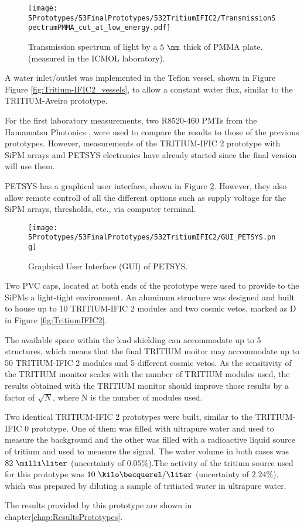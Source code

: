 \begin{figure}[h]
\centering
\texttt{[image: 5Prototypes/53FinalPrototypes/532TritiumIFIC2/TransmissionSpectrumPMMA\_cut\_at\_low\_energy.pdf]}
\caption{Transmission spectrum of light by a $5~\mm$ thick of PMMA plate. (measured in the ICMOL laboratory). \label{fig:PMMATransmissionSpectrum}}
\end{figure}	

A water inlet/outlet was implemented in the Teflon vessel, shown in Figure Figure \ref{fig:Tritium-IFIC2_vessels}, to allow a constant water flux, similar to the TRITIUM-Aveiro prototype.

For the first laboratory measurements, two R8520-460 PMTs from the Hamamatsu Photonics \cite{DataSheetPMTs}, were used to compare the results to those of the previous prototypes. However, measurements of the TRITIUM-IFIC 2 prototype with SiPM arrays and PETSYS electronics have already started since the final version will use them.


PETSYS has a graphical user interface, shown in Figure \ref{fig:GUI_PETSYS}. However, they also allow remote controll of all the different options such as supply voltage for the SiPM arrays, thresholds, etc., via computer terminal. 

\begin{figure}[h]
\centering
\texttt{[image: 5Prototypes/53FinalPrototypes/532TritiumIFIC2/GUI\_PETSYS.png]}
\caption{Graphical User Interface (GUI) of PETSYS.\label{fig:GUI_PETSYS}}
\end{figure}

Two PVC caps, located at both ends of the prototype were used to provide to the SiPMs a light-tight environment. An aluminum structure was designed and built to house up to 10 TRITIUM-IFIC 2 modules and two cosmic vetos, marked as D in Figure \ref{fig:TritiumIFIC2}.

The available space within the lead shielding can accommodate up to 5 structures, which means that the final TRITIUM moitor may accommodate up to 50 TRITIUM-IFIC 2 modules and 5 different cosmic vetos. As the sensitivity of the TRITIUM monitor scales with the number of TRITIUM modules used, the results obtained with the TRITIUM monitor should improve those results by a factor of $\sqrt{N}$, where N is the number of modules used.

Two identical TRITIUM-IFIC 2 prototypes were built, similar to the TRITIUM-IFIC 0 prototype. One of them was filled with ultrapure water and used to measure the background and the other was filled with a radioactive liquid source of tritium and used to measure the signal. The water volume in both cases was $82~\milli\liter$ (uncertainty of $0.05\%$).The activity of the tritium source used for this prototype was $10~\kilo\becquerel/\liter$ (uncertainty of $2.24\%$), which was prepared by diluting a sample of tritiated water in ultrapure water.

The results provided by this prototype are shown in chapter\ref{chap:ResultsPrototypes}.